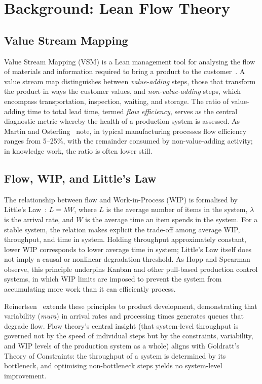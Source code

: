 \documentclass[journal]{IEEEtran}
\begin{document}
\section{Background: Lean Flow Theory}
\label{sec:background}

\subsection{Value Stream Mapping}

Value Stream Mapping (VSM) is a Lean management tool for analysing the flow of materials and information required to bring a product to the customer~\cite{rother1999}. A value stream map distinguishes between \emph{value-adding} steps, those that transform the product in ways the customer values, and \emph{non-value-adding} steps, which encompass transportation, inspection, waiting, and storage. The ratio of value-adding time to total lead time, termed \emph{flow efficiency}, serves as the central diagnostic metric whereby the health of a production system is assessed. As Martin and Osterling~\cite{martin2013} note, in typical manufacturing processes flow efficiency ranges from 5--25\%, with the remainder consumed by non-value-adding activity; in knowledge work, the ratio is often lower still.

\subsection{Flow, WIP, and Little's Law}

The relationship between flow and Work-in-Process (WIP) is formalised by Little's Law~\cite{little1961}: $L = \lambda W$, where $L$ is the average number of items in the system, $\lambda$ is the arrival rate, and $W$ is the average time an item spends in the system. For a stable system, the relation makes explicit the trade-off among average WIP, throughput, and time in system. Holding throughput approximately constant, lower WIP corresponds to lower average time in system; Little's Law itself does not imply a causal or nonlinear degradation threshold. As Hopp and Spearman~\cite{hopp2004} observe, this principle underpins Kanban and other pull-based production control systems, in which WIP limits are imposed to prevent the system from accumulating more work than it can efficiently process.

Reinertsen~\cite{reinertsen2009} extends these principles to product development, demonstrating that variability (\emph{mura}) in arrival rates and processing times generates queues that degrade flow. Flow theory's central insight (that system-level throughput is governed not by the speed of individual steps but by the constraints, variability, and WIP levels of the production system as a whole) aligns with Goldratt's~\cite{goldratt1984} Theory of Constraints: the throughput of a system is determined by its bottleneck, and optimising non-bottleneck steps yields no system-level improvement.
\end{document}
